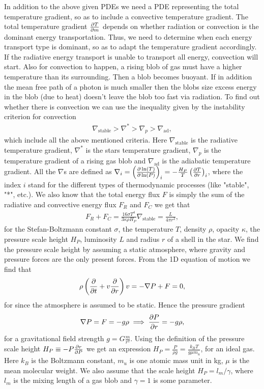 \documentclass{emulateapj}
\begin{document}
	In addition to the above given PDEs we need a PDE representing the total temperature gradient, so as to include a convective temperature gradient. The total temperature gradient $\pdv{T}{m}$ depends on whether radiation or convection is the dominant energy transportation. Thus, we need to determine when each energy transport type is dominant, so as to adapt the temperature gradient accordingly. If the radiative energy transport is unable to transport all energy, convection will start. Also for convection to happen, a rising blob of gas must have a higher temperature than its surrounding. Then a blob becomes buoyant. If in addition the mean free path of a photon is much smaller then the blobs size excess energy in the blob (due to heat) doesn't leave the blob too fast via radiation. To find out whether there is convection we can use the inequality given by the instability criterion for convection
	\begin{align}
		\nabla_\text{stable} > \nabla^*>\nabla_p>\nabla_\text{ad},
	\end{align}
	which include all the above mentioned criteria. Here $\nabla_\text{stable}$ is the radiative temperature gradient, $\nabla^*$ is the stars temperature gradient, $\nabla_p$ is the temperature gradient of a rising gas blob and $\nabla_\text{ad}$ is the adiabatic temperature gradient. All the $\nabla$s are defined as $\nabla_i = \left(\pdv{\ln(T)}{\ln(P)}\right)_i = -\frac{H_P}{T}\left(\pdv{T}{r}\right)_i$, where the index $i$ stand for the different types of thermodynamic processes (like "stable", "*", etc.). We also know that the total energy flux $F$ is simply the sum of the radiative and convective energy flux $F_R$ and $F_C$ we get that
	\begin{align}
		F_R + F_C = \frac{16\sigma T^4}{3\kappa\rho H_P}\nabla_\text{stable} = \frac{L}{4\pi r^2},
		\label{eq:flux}
	\end{align} 
	for the Stefan-Boltzmann constant $\sigma$, the temperature $T$, density $\rho$, opacity $\kappa$, the pressure scale height $H_P$, luminosity $L$ and radius $r$ of a shell in the star. 
	We find the pressure scale height by assuming a static atmosphere, where gravity and pressure forces are the only present forces. From the 1D equation of motion we find that
	\begin{align}
		\rho\left(\pdv{}{t} + v\pdv{}{r}\right)v = -\nabla P + F = 0,
	\end{align}
	for since the atmosphere is assumed to be static. Hence the pressure gradient
	\begin{align}
		\nabla P = F = -g\rho \implies \pdv{P}{r} = -g\rho,
	\end{align}
	for a gravitational field strength $g = G\frac{m}{r^2}$. Using the definition of the pressure scale height $H_P \equiv -P \pdv{r}{P}$ we get an expression $H_P = \frac{P}{\rho g} = \frac{k_B T}{g\mu m_u}$, for an ideal gas. Here $k_B$ is the Boltzmann constant, $m_u$ is one atomic mass unit in kg, $\mu$ is the mean molecular weight.
	We also assume that the scale height $H_P = l_m/\gamma$, where $l_m$ is the mixing length of a gas blob and $\gamma=1$ is some parameter.
	
\end{document}
